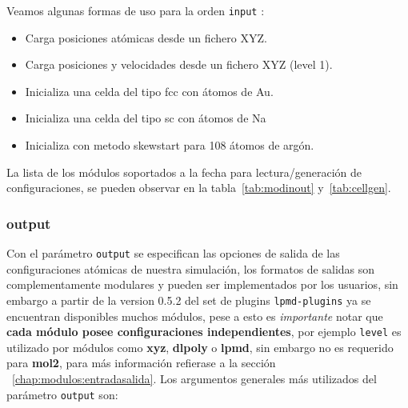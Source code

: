 Veamos algunas formas de uso para la orden \verb|input| :

\begin{itemize}
\item Carga posiciones at\'omicas desde un fichero XYZ.
\item Carga posiciones y velocidades desde un fichero XYZ (level 1).
\item Inicializa una celda del tipo fcc con átomos de Au.
\item Inicializa una celda del tipo sc con átomos de Na
\item Inicializa con metodo skewstart para 108 \'atomos de arg\'on.
\end{itemize}

La lista de los m\'odulos soportados a la fecha para lectura/generaci\'on de configuraciones, se pueden observar en la tabla~\ref{tab:modinout} y~\ref{tab:cellgen}.

\subsubsection{output}

Con el par\'ametro \verb|output| se especifican las opciones de salida de las configuraciones at\'omicas de nuestra simulaci\'on, los formatos de salidas son complementamente modulares y pueden ser implementados por los usuarios, sin embargo a partir de la version 0.5.2 del set de plugins \verb|lpmd-plugins| ya se encuentran disponibles muchos m\'odulos, pese a esto es \textit{importante} notar que \textbf{cada m\'odulo posee configuraciones independientes}, por ejemplo \verb|level| es utilizado por m\'odulos como \textbf{xyz}, \textbf{dlpoly} o \textbf{lpmd}, sin embargo no es requerido para \textbf{mol2}, para m\'as informaci\'on refierase a la secci\'on ~\ref{chap:modulos:entradasalida}. Los argumentos generales m\'as utilizados del par\'ametro \verb|output| son:


